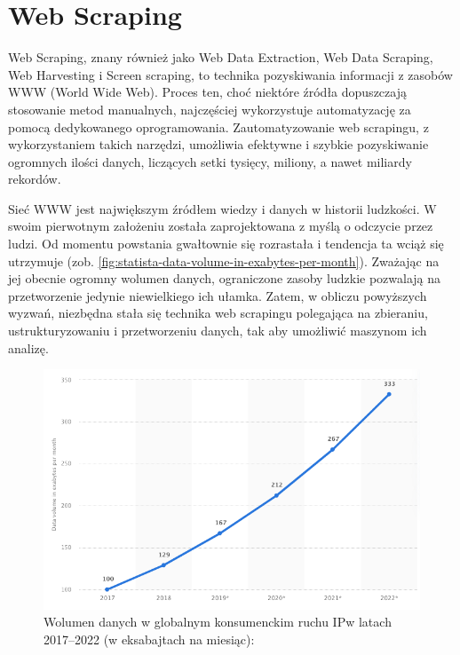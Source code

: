 \newpage

\section{Web Scraping}\label{sec:teoria}

Web Scraping, znany również jako Web Data Extraction, Web Data Scraping, Web Harvesting i Screen scraping, to technika pozyskiwania informacji z zasobów WWW (World Wide Web)\cite{Zhao2017}.
Proces ten, choć niektóre źródła dopuszczają stosowanie metod manualnych\cite{applications-and-tools}, najczęściej wykorzystuje automatyzację za pomocą dedykowanego oprogramowania.
Zautomatyzowanie web scrapingu, z wykorzystaniem takich narzędzi, umożliwia efektywne i szybkie pozyskiwanie ogromnych ilości danych, liczących setki tysięcy, miliony, a nawet miliardy rekordów.

Sieć WWW jest największym źródłem wiedzy i danych w historii ludzkości.
W swoim pierwotnym założeniu została zaprojektowana z myślą o odczycie przez ludzi.
Od momentu powstania gwałtownie się rozrastała i tendencja ta wciąż się utrzymuje (zob. \autoref{fig:statista-data-volume-in-exabytes-per-month}).
Zważając na jej obecnie ogromny wolumen danych, ograniczone zasoby ludzkie pozwalają na przetworzenie jedynie niewielkiego ich ułamka.
Zatem, w obliczu powyższych wyzwań, niezbędna stała się technika web scrapingu polegająca na zbieraniu, ustrukturyzowaniu i przetworzeniu danych, tak aby umożliwić maszynom ich analizę.

\begin{figure}[H]
    \centering
    \captionsetup{width=.8\linewidth}
    \includegraphics[width=\textwidth]{img/statista-data-volume-in-exabytes-per-month}
    \caption{Wolumen danych w globalnym konsumenckim ruchu IP\newline w latach 2017–2022 (w eksabajtach na miesiąc): ~\cite{statista-data-volume}}
    \label{fig:statista-data-volume-in-exabytes-per-month}
\end{figure}

